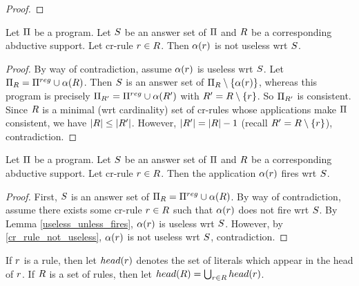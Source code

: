 \documentclass{paper}
\begin{document}
\begin{flushleft}
\begin{proof}
\end{proof}

\begin{lemma}
\label{cr_rule_not_useless}

Let $\Pi$ be a \cp{} program.
Let $S$ be an answer set of $\Pi$ and $R$ be a
corresponding abductive support.
Let cr-rule $r \in R$.
Then $\alpha(r)$ is not useless wrt $S$.

\end{lemma}

\begin{proof}

By way of contradiction, assume $\alpha(r)$ is useless wrt
$S$.
Let $\Pi_{R} = \Pi^{reg} \cup \alpha(R)$.
Then $S$ is an answer set of
$\Pi_{R} \setminus \{\alpha(r)\}$,
whereas this program is precisely $\Pi_{{R}'} = \Pi^{reg} \cup \alpha({R}')$ with
${R}' = R \setminus \{r\}$.
So $\Pi_{{R}'}$ is consistent.
Since $R$ is a minimal (wrt cardinality) set of cr-rules
whose applications make $\Pi$ consistent,
we have $|R| \le |{R}'|$.
However, $|{R}'| = |R| - 1$
(recall ${R}' = R \setminus \{r\}$), contradiction.

\end{proof}

\begin{lemma}
\label{abductive_support_fires}

Let $\Pi$ be a \cp{} program.
Let $S$ be an answer set of $\Pi$ and $R$ be a
corresponding abductive support.
Let cr-rule $r \in R$.
Then the application $\alpha(r)$ fires wrt $S$.

\end{lemma}

\begin{proof}

First, $S$ is an answer set of $\Pi_{R} = \Pi^{reg} \cup \alpha(R)$.
By way of contradiction, assume there exists some cr-rule
$r \in R$ such that
$\alpha(r)$ does not fire wrt $S$.
By Lemma \ref{useless_unless_fires}, $\alpha(r)$ is useless
wrt $S$.
However, by \ref{cr_rule_not_useless}, $\alpha(r)$ is not
useless wrt $S$, contradiction.

\end{proof}

\begin{definition}
[Head]

If $r$ is a rule, then let $head(r)$ denotes the set of
literals which appear in the head of $r$.
If $R$ is a set of rules, then let
$head(R) = \bigcup_{r \in R} head(r)$.


\end{definition}
\end{flushleft}
\end{document}

